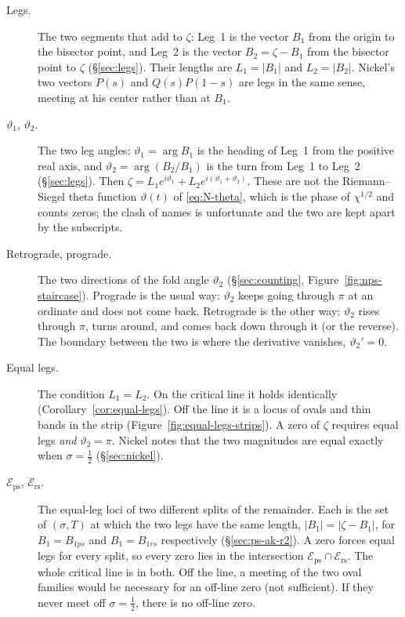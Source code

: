 \documentclass[11pt]{article}
\theoremstyle{definition}
\begin{document}
\begin{description}
\item[Legs.]
The two segments that add to $\zeta$: Leg~1 is the vector $B_1$
from the origin to the bisector point, and Leg~2 is the vector
$B_2=\zeta-B_1$ from the bisector point to $\zeta$
(\S\ref{sec:legs}).
Their lengths are $L_1=|B_1|$ and $L_2=|B_2|$.
Nickel's two vectors $P(s)$ and $Q(s)P(1-s)$ are legs in the same
sense, meeting at his center rather than at $B_1$.

\item[$\vartheta_1$, $\vartheta_2$.]
The two leg angles:
$\vartheta_1=\arg B_1$ is the heading of Leg~1 from the positive
real axis, and
$\vartheta_2=\arg(B_2/B_1)$ is the turn from Leg~1 to Leg~2
(\S\ref{sec:legs}).
Then $\zeta=L_1 e^{i\vartheta_1}+L_2 e^{i(\vartheta_1+\vartheta_2)}$.
These are not the Riemann--Siegel theta function $\vartheta(t)$ of
\eqref{eq:N-theta}, which is the phase of $\chi^{1/2}$ and counts
zeros; the clash of names is unfortunate and the two are kept
apart by the subscripts.

\item[Retrograde, prograde.]
The two directions of the fold angle $\vartheta_2$
(\S\ref{sec:counting}, Figure~\ref{fig:nps-staircase}).
Prograde is the usual way: $\vartheta_2$ keeps going through
$\pi$ at an ordinate and does not come back.
Retrograde is the other way: $\vartheta_2$ rises through $\pi$,
turns around, and comes back down through it (or the reverse).
The boundary between the two is where the derivative vanishes,
$\vartheta_2'=0$.

\item[Equal legs.]
The condition $L_1=L_2$.
On the critical line it holds identically
(Corollary~\ref{cor:equal-legs}).
Off the line it is a locus of ovals and thin bands in the strip
(Figure~\ref{fig:equal-legs-strips}).
A zero of $\zeta$ requires equal legs \emph{and} $\vartheta_2=\pi$.
Nickel notes that the two magnitudes are equal exactly when
$\sigma=\tfrac12$ (\S\ref{sec:nickel}).

\item[$\mathcal{E}_{\mathrm{ps}}$, $\mathcal{E}_{\mathrm{rs}}$.]
The equal-leg loci of two different splits of the remainder.
Each is the set of $(\sigma,T)$ at which the two legs have the
same length, $|B_1|=|\zeta-B_1|$, for $B_1=B_{1ps}$ and
$B_1=B_{1rs}$ respectively
(\S\ref{sec:ps-ak-r2}).
A zero forces equal legs for every split, so every zero lies in
the intersection
$\mathcal{E}_{\mathrm{ps}}\cap\mathcal{E}_{\mathrm{rs}}$.
The whole critical line is in both.
Off the line, a meeting of the two oval families would be
necessary for an off-line zero (not sufficient).
If they never meet off $\sigma=\tfrac12$, there is no off-line
zero.


\end{description}
\end{document}
